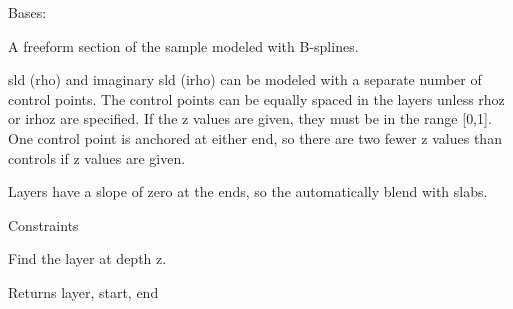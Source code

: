 \documentclass[letterpaper,10pt,english]{sphinxmanual}
\begin{document}

\begin{fulllineitems}
\label{api/freeform:refl1d.freeform.FreeLayer}
Bases: {\hyperref[api/model:refl1d.model.Layer]{}}

A freeform section of the sample modeled with B-splines.

sld (rho) and imaginary sld (irho) can be modeled with a separate
number of control points. The control points can be equally spaced
in the layers unless rhoz or irhoz are specified. If the z values
are given, they must be in the range {[}0,1{]}.  One control point is
anchored at either end, so there are two fewer z values than controls
if z values are given.

Layers have a slope of zero at the ends, so the automatically blend
with slabs.

\begin{fulllineitems}
\label{api/freeform:refl1d.freeform.FreeLayer.constraints}
Constraints

\end{fulllineitems}


\begin{fulllineitems}
\label{api/freeform:refl1d.freeform.FreeLayer.find}
Find the layer at depth z.

Returns layer, start, end

\end{fulllineitems}


\begin{fulllineitems}
\label{api/freeform:refl1d.freeform.FreeLayer.parameters}
\end{fulllineitems}


\begin{fulllineitems}
\label{api/freeform:refl1d.freeform.FreeLayer.render}
\end{fulllineitems}


\end{fulllineitems}
\end{document}
